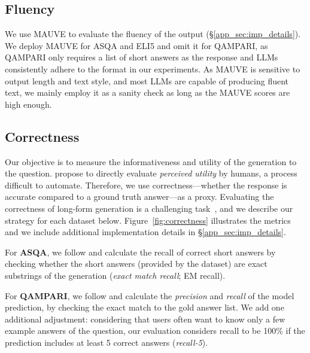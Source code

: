 \documentclass[11pt]{article}
\newcommand\tf[1]{\textbf{#1}}
\begin{document}
\subsection{Fluency} 
We use MAUVE \cite{pillutla2021mauve} to evaluate the fluency of the output (\S\ref{app_sec:imp_details}).
We deploy MAUVE for ASQA and ELI5
and omit it for QAMPARI,
as QAMPARI 
only requires a list of short answers as the response
and LLMs consistently adhere to the format  in our experiments.
As MAUVE is sensitive to output length and text style, and most LLMs are capable of producing fluent text,
we mainly employ it as a sanity check as long as the MAUVE scores are high enough.



\subsection{Correctness}
\label{sec:correctness}





Our objective is to measure the informativeness and utility of the generation  to the question. 
\citet{liu2023evaluating} propose to directly evaluate \textit{perceived utility}
by humans, a process difficult to automate. 
Therefore, we use correctness---whether the response is accurate compared to a ground truth answer---as a proxy.
Evaluating the correctness of long-form generation is a challenging task~\citep{krishna-etal-2021-hurdles},
and we describe our strategy for each dataset below.
Figure~\ref{fig:correctness} illustrates the metrics and we include additional implementation details in \S\ref{app_sec:imp_details}.


For \tf{ASQA}, we follow \citet{stelmakh2022asqa} and 
calculate the recall of correct short answers
by checking whether the short answers (provided by the dataset) are exact substrings of the generation (\textit{exact match recall}; EM recall).


For \tf{QAMPARI}, we follow \citet{rubin2022qampari} and calculate the \textit{precision} and \textit{recall} of 
the model prediction, 
by checking the exact match to the gold answer list.
We add one additional adjustment:
considering that users often  want to know only a few example answers of 
the question, %
our evaluation considers recall to be 100\% if the prediction includes at least 5 correct answers (\textit{recall-5}).
\end{document}
